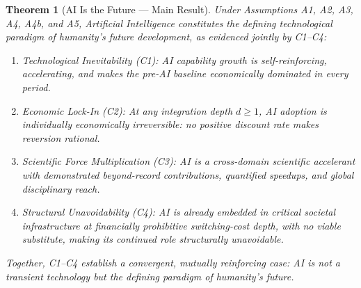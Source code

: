 \documentclass[12pt]{article}
\newtheorem{theorem}{Theorem}
\begin{document}
\begin{theorem}[AI Is the Future --- Main Result]
  Under Assumptions A1, A2, A3, A4, A4b, and A5, Artificial Intelligence
  constitutes the defining technological paradigm of humanity's future
  development, as evidenced jointly by C1--C4:

  \begin{enumerate}
    \item \emph{Technological Inevitability (C1):} AI capability growth
      is self-reinforcing, accelerating, and makes the pre-AI baseline
      economically dominated in every period.

    \item \emph{Economic Lock-In (C2):} At any integration depth
      $d \geq 1$, AI adoption is individually economically irreversible:
      no positive discount rate makes reversion rational.

    \item \emph{Scientific Force Multiplication (C3):} AI is a
      cross-domain scientific accelerant with demonstrated beyond-record
      contributions, quantified speedups, and global disciplinary reach.

    \item \emph{Structural Unavoidability (C4):} AI is already embedded
      in critical societal infrastructure at financially prohibitive
      switching-cost depth, with no viable substitute, making its
      continued role structurally unavoidable.
  \end{enumerate}

  Together, C1--C4 establish a convergent, mutually reinforcing case:
  AI is not a transient technology but the defining paradigm of
  humanity's future.
\end{theorem}
\end{document}
